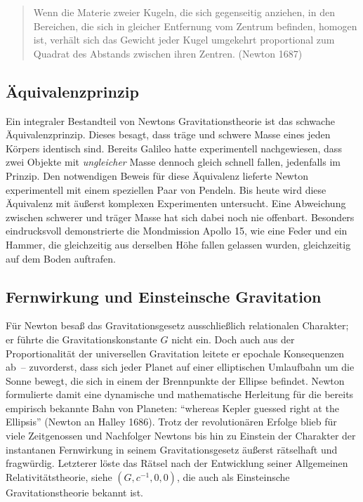 \begin{quote}
  Wenn die Materie zweier Kugeln, die sich gegenseitig anziehen, in den Bereichen, die sich in gleicher Entfernung vom Zentrum befinden, homogen ist, verhält sich das Gewicht jeder Kugel umgekehrt proportional zum Quadrat des Abstands zwischen ihren Zentren. (Newton 1687)
\end{quote}


\subsection*{Äquivalenzprinzip}

Ein integraler Bestandteil von Newtons Gravitationstheorie ist das schwache Äquivalenzprinzip. Dieses besagt, dass träge und schwere Masse eines jeden Körpers identisch sind. Bereits Galileo hatte experimentell nachgewiesen, dass zwei Objekte mit \emph{ungleicher} Masse dennoch gleich schnell fallen, jedenfalls im Prinzip. Den notwendigen Beweis für diese Äquivalenz lieferte Newton experimentell mit einem speziellen Paar von Pendeln. Bis heute wird diese Äquivalenz mit äußerst komplexen Experimenten untersucht. Eine Abweichung zwischen schwerer und träger Masse hat sich dabei noch nie offenbart. Besonders eindrucksvoll demonstrierte die Mondmission Apollo 15, wie eine Feder und ein Hammer, die gleichzeitig aus derselben Höhe fallen gelassen wurden, gleichzeitig auf dem Boden auftrafen.


\subsection*{Fernwirkung und Einsteinsche Gravitation}

Für Newton besaß das Gravitationsgesetz ausschließlich relationalen Charakter; er führte die Gravitationskonstante $G$ nicht ein. Doch auch aus der Proportionalität der universellen Gravitation leitete er epochale Konsequenzen ab~-- zuvorderst, dass sich jeder Planet auf einer elliptischen Umlaufbahn um die Sonne bewegt, die sich in einem der Brennpunkte der Ellipse befindet. Newton formulierte damit eine dynamische und mathematische Herleitung für die bereits empirisch bekannte Bahn von Planeten: \enquote{whereas Kepler guessed right at the Ellipsis} (Newton an Halley 1686). Trotz der revolutionären Erfolge blieb für viele Zeitgenossen und Nachfolger Newtons bis hin zu Einstein der Charakter der instantanen Fernwirkung in seinem Gravitationsgesetz äußerst rätselhaft und fragwürdig. Letzterer löste das Rätsel nach der Entwicklung seiner Allgemeinen Relativitätstheorie, siehe $(G,c^{-1},0,0)$, die auch als Einsteinsche Gravitationstheorie bekannt ist.